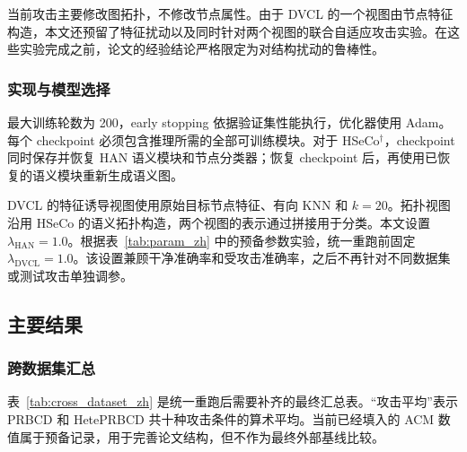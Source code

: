 当前攻击主要修改图拓扑，不修改节点属性。由于 DVCL 的一个视图由节点特征构造，本文还预留了特征扰动以及同时针对两个视图的联合自适应攻击实验。在这些实验完成之前，论文的经验结论严格限定为对结构扰动的鲁棒性。

\subsubsection{实现与模型选择}

最大训练轮数为 200，early stopping 依据验证集性能执行，优化器使用 Adam。每个 checkpoint 必须包含推理所需的全部可训练模块。对于 HSeCo$^{\dagger}$，checkpoint 同时保存并恢复 HAN 语义模块和节点分类器；恢复 checkpoint 后，再使用已恢复的语义模块重新生成语义图。

DVCL 的特征诱导视图使用原始目标节点特征、有向 KNN 和 $k=20$。拓扑视图沿用 HSeCo 的语义拓扑构造，两个视图的表示通过拼接用于分类。本文设置 $\lambda_{\mathrm{HAN}}=1.0$。根据表~\ref{tab:param_zh} 中的预备参数实验，统一重跑前固定 $\lambda_{\mathrm{DVCL}}=1.0$。该设置兼顾干净准确率和受攻击准确率，之后不再针对不同数据集或测试攻击单独调参。

\FloatBarrier
\subsection{主要结果}

\subsubsection{跨数据集汇总}

表~\ref{tab:cross_dataset_zh} 是统一重跑后需要补齐的最终汇总表。“攻击平均”表示 PRBCD 和 HetePRBCD 共十种攻击条件的算术平均。当前已经填入的 ACM 数值属于预备记录，用于完善论文结构，但不作为最终外部基线比较。

